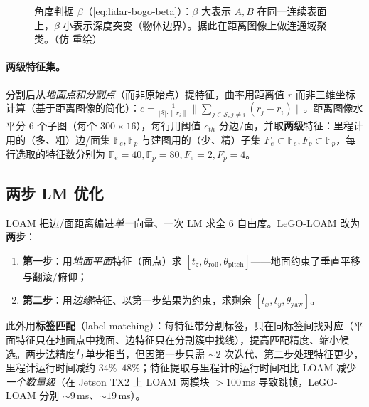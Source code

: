 \begin{figure}[ht]
\centering
{}
\caption{角度判据 $\beta$（\cref{eq:lidar-bogo-beta}）：$\beta$ 大表示 $A,B$ 在同一连续表面上，$\beta$ 小表示深度突变（物体边界）。据此在距离图像上做连通域聚类。（仿 \cite{bogoslavskyi2016fast} 重绘）}
\label{fig:lidar-bogo}
\end{figure}

\paragraph{两级特征集。}
分割后从\emph{地面点和分割点}（而非原始点）提特征，曲率用距离值 $r$ 而非三维坐标计算（基于距离图像的简化）：$c=\frac{1}{|\mathcal{S}|\cdot\|r_i\|}\big\|\sum_{j\in\mathcal{S},j\neq i}(r_j-r_i)\big\|$。距离图像水平分 $6$ 个子图（每个 $300\times16$），每行用阈值 $c_{th}$ 分边/面，并取\textbf{两级}特征\cite{shan2018legoloam}：里程计用的（多、粗）边/面集 $\mathbb{F}_e,\mathbb{F}_p$ 与建图用的（少、精）子集 $F_e\subset\mathbb{F}_e,F_p\subset\mathbb{F}_p$，每行选取的特征数分别为 $\mathbb{F}_e{=}40,\mathbb{F}_p{=}80,F_e{=}2,F_p{=}4$。

\subsection{两步 LM 优化}
\label{sec:lidar-lego-twostep}

LOAM 把边/面距离编进\emph{单一}向量、一次 LM 求全 $6$ 自由度。LeGO-LOAM 改为\textbf{两步}\cite{shan2018legoloam}：
\begin{enumerate}
  \item \textbf{第一步}：用\emph{地面平面}特征（面点）求 $[t_z,\theta_{\text{roll}},\theta_{\text{pitch}}]$——地面约束了垂直平移与翻滚/俯仰；
  \item \textbf{第二步}：用\emph{边缘}特征、以第一步结果为约束，求剩余 $[t_x,t_y,\theta_{\text{yaw}}]$。
\end{enumerate}
此外用\textbf{标签匹配}（label matching）：每特征带分割标签，只在同标签间找对应（平面特征只在地面点中找面、边特征只在分割簇中找线），提高匹配精度、缩小候选。两步法精度与单步相当，但因第一步只需 $\sim 2$ 次迭代、第二步处理特征更少，里程计运行时间减约 $34\%$–$48\%$；特征提取与里程计的运行时间相比 LOAM 减少\emph{一个数量级}（在 Jetson TX2 上 LOAM 两模块 $>100$\,ms 导致跳帧，LeGO-LOAM 分别 $\sim 9$\,ms、$\sim 19$\,ms）。

